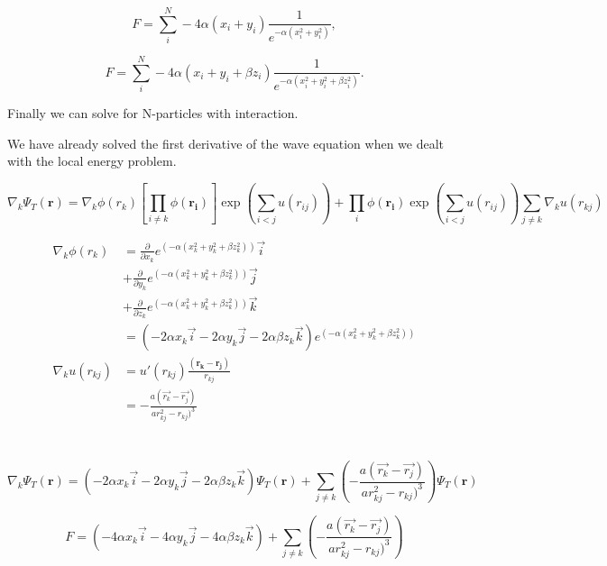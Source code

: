 $$F = \sum_i^N -4\alpha (x_i + y_i) \frac{1}{e^{-\alpha (x_i^2 + y_i^2)}},$$

$$F = \sum_i^N -4\alpha (x_i + y_i + \beta z_i) \frac{1}{e^{-\alpha (x_i^2 + y_i^2 + \beta z_i^2)}}.$$

Finally we can solve for N-particles with interaction.

We have already solved the first derivative of the wave equation when we dealt with the local energy problem.

$$\nabla_k \Psi_T(\mathbf{r}) = \nabla_k \phi(r_k) \left[\prod_{i\ne k} \phi(\mathbf{r_i})\right] \exp \left(\sum_{i<j}u(r_{ij})\right) +  \prod_{i} \phi (\mathbf{r_i}) \exp \left(\sum_{i<j}u(r_{ij})\right) \sum_{j\ne k} \nabla_k u(r_{kj})$$

\begin{align*}
\nabla_k \phi(r_k) &= \frac{\partial}{\partial x_k} e^{(-\alpha (x_k^2 + y_k^2 + \beta z_k^2))} \vec{i} \\
&+ \frac{\partial}{\partial y_k} e^{(-\alpha (x_k^2 + y_k^2 + \beta z_k^2))} \vec{j} \\
&+ \frac{\partial}{\partial z_k} e^{(-\alpha (x_k^2 + y_k^2 + \beta z_k^2))} \vec{k} \\
&= (-2\alpha x_k \vec{i} -2\alpha y_k \vec{j} -2\alpha \beta z_k \vec{k}) e^{(-\alpha (x_k^2 + y_k^2 + \beta z_k^2))}\\
\nabla_k u(r_{kj}) &= u'(r_{kj}) \frac{(\mathbf{r_k} - \mathbf{r_j})}{r_{kj}}\\
&= - \frac{a(\vec{r_k} - \vec{r_j})}{ar_{kj}^2 - r_{kj})^3}
\end{align*}
\\
\\

$$\nabla_k \Psi_T(\mathbf{r}) = (-2\alpha x_k \vec{i} - 2\alpha y_k \vec{j} - 2\alpha \beta z_k \vec{k}) \Psi_T(\mathbf{r})  + \sum_{j \ne k} \left( - \frac{a(\vec{r_k} - \vec{r_j})}{ar_{kj}^2 - r_{kj})^3} \right)\Psi_T(\mathbf{r})$$

$$F = (-4\alpha x_k \vec{i} - 4\alpha y_k \vec{j} - 4\alpha \beta z_k \vec{k}) + \sum_{j \ne k} \left( - \frac{a(\vec{r_k} - \vec{r_j})}{ar_{kj}^2 - r_{kj})^3} \right)$$

